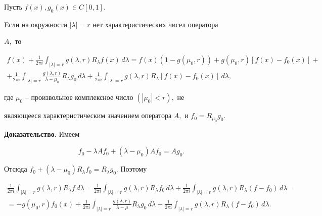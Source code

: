 \begin{thm}


Пусть $f(x),g_0(x)\in C[0,1]$.


Eсли на окружности $|\lambda|=r$ нет характеристических чисел оператора


$A,$ то


\begin{multline*}


f(x)+\frac 1{2\pi i}\int_{|\lambda|=r}g(\lambda ,r)R_{\lambda}


f(x)\,d\lambda =f(x)(1-g(\mu_0,r))+g(\mu_0,r)[f(x)-f_0(x)]+ \\


%


+\frac 1{2\pi i}\int_{|\lambda|=r}\frac {g(\lambda ,r)}{\lambda


-\mu_0}R_{\lambda}g_0\,d\lambda +\frac 1{2\pi i}\int_{|\lambda|=r}


g(\lambda ,r)R_{\lambda}[f(x)-f_0(x)]\,d\lambda ,


\end{multline*}


где $\mu_0$ -- произвольное комплексное число $(|\mu_0|<r),$ не


являющееся характеристическим значением оператора $A,$ и $f_0=


R_{\mu_0}g_0.$


\end{thm}





{\bf Доказательство.} Имеем


$$


f_0-\lambda Af_0+(\lambda-\mu_0)Af_0=Ag_0.


$$


Отсюда $f_0+(\lambda -\mu_0)R_{\lambda}f_0=R_{\lambda}g_0.$ Поэтому


\begin{multline*}


\frac 1{2\pi i}\int_{|\lambda|=r}g(\lambda ,r)


R_{\lambda}f\,d\lambda=


\frac 1{2\pi i}\int_{|\lambda|=r}g(\lambda ,r)


R_{\lambda}f_0\,d\lambda +\frac 1{2\pi i}\int_{|\lambda|=r}


g(\lambda ,r)R_\lambda (f-f_0)\,d\lambda = \\


%


=-g(\mu_0,r)f_0(x)+\frac 1{2\pi i}\int_{|\lambda|=r}


\frac {g(\lambda ,r)}{\lambda -\mu }R_\lambda g_0\,d\lambda


+\frac 1{2\pi i}\int_{|\lambda|=r}


g(\lambda ,r)R_\lambda (f-f_0)\,d\lambda .


\end{multline*}


